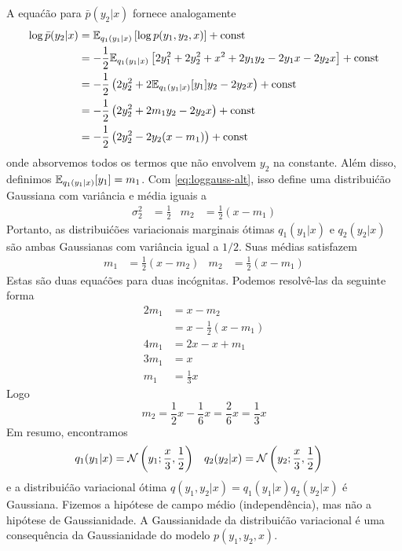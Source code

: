 \begin{exenumerate}
\begin{solution}
        A equa\'c\~ao para $\bar{p}(y_2|x)$ fornece analogamente
        \begin{align}
            \log  \bar{p}(y_2|x) & =  \mathbb{E}_{q_1(y_1|x)}\left[ \log p(y_1, y_2, x)\right] + \text{const}\\
            & = -\frac{1}{2} \mathbb{E}_{q_1(y_1|x)}\left[  2 y_1^2 + 2 y_2^2 + x^2 + 2 y_1 y_2 - 2 y_1 x - 2y_2 x \right] + \text{const}\\
            & = -\frac{1}{2} \left(2 y_2^2 + 2 \mathbb{E}_{q_1(y_1|x)}[y_1] y_2 - 2y_2 x \right) + \text{const}\\
            & = -\frac{1}{2} \left(2 y_2^2 + 2 m_1 y_2 - 2 y_2 x \right) + \text{const}\\
            & = -\frac{1}{2} \left(2 y_2^2 - 2 y_2(x-m_1) \right) + \text{const}
            \label{eq:barp2-alt}
        \end{align}
        onde absorvemos todos os termos que n\~ao envolvem $y_2$ na
        constante. Al\'em disso, definimos $\mathbb{E}_{q_1(y_1|x)}[y_1]=m_1$. Com
        \eqref{eq:loggauss-alt}, isso define uma distribui\'c\~ao Gaussiana com 
        vari\^ancia e m\'edia iguais a
        \begin{align}
            \sigma_2^2 &= \frac{1}{2} & m_2 & = \frac{1}{2}(x-m_1)
        \end{align}
        Portanto, as distribui\'c\~oes variacionais marginais \'otimas $q_1(y_1|x)$ e
        $q_2(y_2|x)$ s\~ao ambas Gaussianas com vari\^ancia igual a $1/2$. Suas
        m\'edias satisfazem
        \begin{align}
            m_1 & = \frac{1}{2}(x-m_2) & m_2  & = \frac{1}{2}(x-m_1)
        \end{align}
        Estas s\~ao duas equa\'c\~oes para duas inc\'ognitas. Podemos resolv\^e-las da seguinte forma   
        \begin{align}
            2 m_1 &= x - m_2 \\
            & = x -\frac{1}{2}(x-m_1)\\
            4 m_1 & = 2 x -x + m_1 \\
            3 m_1 & = x\\
            m_1 & = \frac{1}{3} x
        \end{align}
        Logo
        \begin{equation}
            m_2 = \frac{1}{2} x - \frac{1}{6} x = \frac{2}{6} x = \frac{1}{3} x
        \end{equation}
        Em resumo, encontramos
        \begin{align}
            q_1(y_1 | x) & = \mathcal{N}\left(y_1; \frac{x}{3}, \frac{1}{2}\right) &  q_2(y_2 | x) & = \mathcal{N}\left(y_2; \frac{x}{3}, \frac{1}{2}\right)
        \end{align}
        e a distribui\'c\~ao variacional \'otima $q(y_1, y_2|x) =
        q_1(y_1|x) q_2(y_2|x)$ \'e Gaussiana. Fizemos a hip\'otese de campo m\'edio
        (independ\^encia), mas n\~ao a hip\'otese de Gaussianidade. A Gaussianidade
        da distribui\'c\~ao variacional \'e uma consequ\^encia da Gaussianidade
        do modelo $p(y_1, y_2, x)$.
        

\end{solution}
\end{exenumerate}
